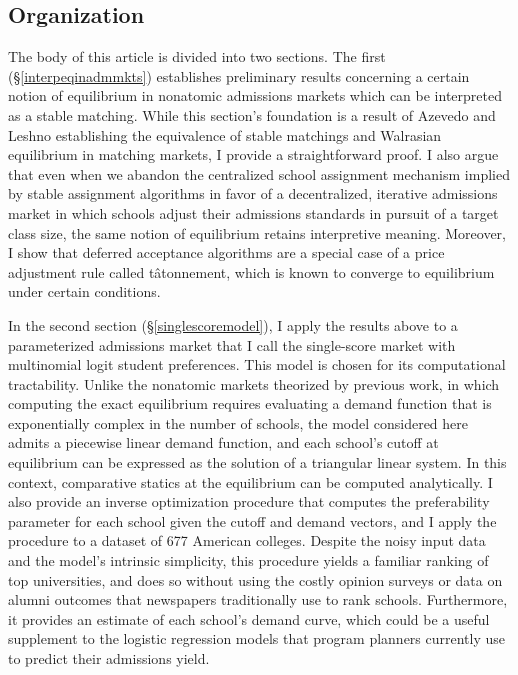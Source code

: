 \documentclass[12pt]{article}
\theoremstyle{definition}
\begin{document}
\subsection{Organization}
The body of this article is divided into two sections. The first (\S\ref{interpeqinadmmkts}) establishes preliminary results concerning a certain notion of equilibrium in nonatomic admissions markets which can be interpreted as a stable matching. While this section's foundation is a result of Azevedo and Leshno \parencite*{supplydemandfw} establishing the equivalence of stable matchings and Walrasian equilibrium in matching markets, I provide a straightforward proof. I also argue that even when we abandon the centralized school assignment mechanism implied by stable assignment algorithms in favor of a decentralized, iterative admissions market in which schools adjust their admissions standards in pursuit of a target class size, the same notion of equilibrium retains interpretive meaning. Moreover, I show that deferred acceptance algorithms are a special case of a price adjustment rule called t\^{a}tonnement, which is known to converge to equilibrium under certain conditions.

In the second section (\S\ref{singlescoremodel}), I apply the results above to a parameterized admissions market that I call the single-score market with multinomial logit student preferences. This model is chosen for its computational tractability. Unlike the nonatomic markets theorized by previous work, in which computing the exact equilibrium requires evaluating a demand function that is exponentially complex in the number of schools, the model considered here admits a piecewise linear demand function, and each school's cutoff at equilibrium can be expressed as the solution of a triangular linear system. In this context, comparative statics at the equilibrium can be computed analytically. I also provide an inverse optimization procedure that computes the preferability parameter for each school given the cutoff and demand vectors, and I apply the procedure to a dataset of 677 American colleges. Despite the noisy input data and the model's intrinsic simplicity, this procedure yields a familiar ranking of top universities, and does so without using the costly opinion surveys or data on alumni outcomes that newspapers traditionally use to rank schools. Furthermore, it provides an estimate of each school's demand curve, which could be a useful supplement to the logistic regression models that program planners currently use to predict their admissions yield.
\end{document}
